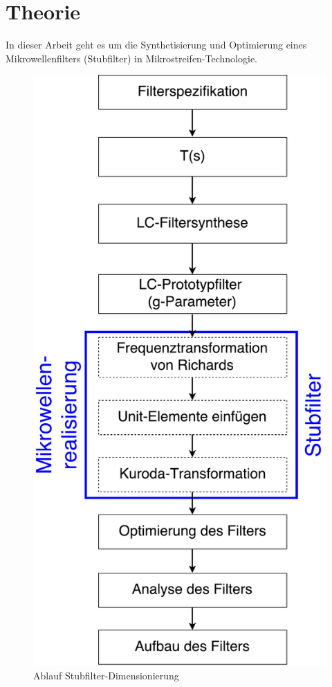 \section{Theorie}


In  dieser  Arbeit  geht  es  um die  Synthetisierung  und  Optimierung  eines
Mikrowellenfilters (Stubfilter) in Mikrostreifen-Technologie.

\begin{figure}[h!]
\centering
 	\includegraphics[width=\imagewidth]{images/Ablauf_Filterdimensionierung.pdf}
 	\caption{Ablauf Stubfilter-Dimensionierung}
 	\label{fig:Ablauf_Filterdimensionierung}
\end{figure}

